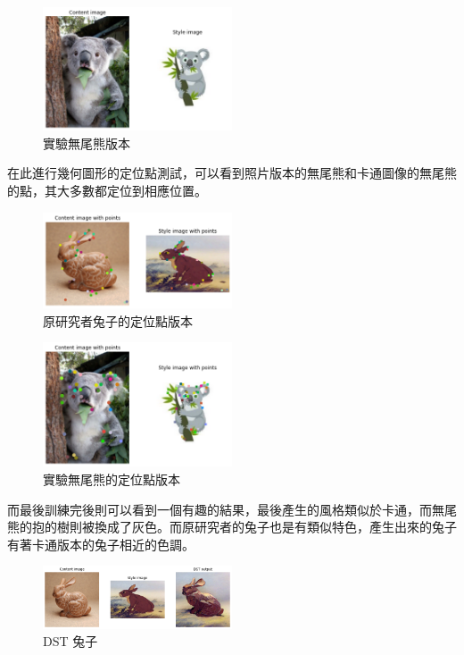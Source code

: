 \documentclass[10pt,UTF8]{ctexart}
\begin{document}
\begin{figure}[H]
\centering 
\includegraphics[width=0.50\textwidth]{t1.png} 
\caption{實驗無尾熊版本}
\label{Test}
\end{figure}

在此進行幾何圖形的定位點測試，可以看到照片版本的無尾熊和卡通圖像的無尾熊的點，其大多數都定位到相應位置。

\begin{figure}[H]
\centering 
\includegraphics[width=0.50\textwidth]{r2.png} 
\caption{原研究者兔子的定位點版本}
\label{Test}
\end{figure}

\begin{figure}[H]
\centering 
\includegraphics[width=0.50\textwidth]{t2.png} 
\caption{實驗無尾熊的定位點版本}
\label{Test}
\end{figure}

而最後訓練完後則可以看到一個有趣的結果，最後產生的風格類似於卡通，而無尾熊的抱的樹則被換成了灰色。而原研究者的兔子也是有類似特色，產生出來的兔子有著卡通版本的兔子相近的色調。

\begin{figure}[H]
\centering 
\includegraphics[width=0.50\textwidth]{r3.png} 
\caption{DST 兔子}
\label{Test}
\end{figure}
\end{document}
